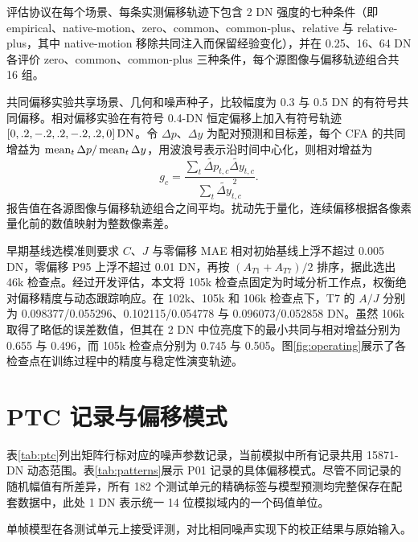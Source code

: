 
评估协议在每个场景、每条实测偏移轨迹下包含 2 DN 强度的七种条件（即 empirical、native-motion、zero、common、common-plus、relative 与 relative-plus，其中 native-motion 移除共同注入而保留经验变化），并在 0.25、16、64 DN 各评价 zero、common、common-plus 三种条件，每个源图像与偏移轨迹组合共 16 组。

共同偏移实验共享场景、几何和噪声种子，比较幅度为 0.3 与 0.5 DN 的有符号共同偏移。相对偏移实验在有符号 0.4-DN 恒定偏移上加入有符号轨迹 $[0,.2,-.2,.2,-.2,.2,0]\,\mathrm{DN}$。令 $\Delta p$、$\Delta y$ 为配对预测和目标差，每个 CFA 的共同增益为 $\operatorname{mean}_t\Delta p/\operatorname{mean}_t\Delta y$，用波浪号表示沿时间中心化，则相对增益为
\begin{equation}
 g_c=\frac{\sum_t\widetilde{\Delta p}_{t,c}\widetilde{\Delta y}_{t,c}}
 {\sum_t\widetilde{\Delta y}_{t,c}^{\,2}}.
\end{equation}
报告值在各源图像与偏移轨迹组合之间平均。扰动先于量化，连续偏移根据各像素量化前的数值映射为整数像素差。

早期基线选模准则要求 $C$、$J$ 与零偏移 MAE 相对初始基线上浮不超过 0.005 DN，零偏移 P95 上浮不超过 0.01 DN，再按 $(A_{T1}+A_{T7})/2$ 排序，据此选出 46k 检查点。经过开发评估，本文将 105k 检查点固定为时域分析工作点，权衡绝对偏移精度与动态跟踪响应。在 102k、105k 和 106k 检查点下，T7 的 $A/J$ 分别为 0.098377/0.055296、0.102115/0.054778 与 0.096073/0.052858 DN。虽然 106k 取得了略低的误差数值，但其在 2 DN 中位亮度下的最小共同与相对增益分别为 0.655 与 0.496，而 105k 检查点分别为 0.745 与 0.505。图\ref{fig:operating}展示了各检查点在训练过程中的精度与稳定性演变轨迹。

\section{PTC 记录与偏移模式}
\label{app:ptc}
\enlargethispage{10pt}


表\ref{tab:ptc}列出矩阵行标对应的噪声参数记录，当前模拟中所有记录共用 15871-DN 动态范围。表\ref{tab:patterns}展示 P01 记录的具体偏移模式。尽管不同记录的随机幅值有所差异，所有 182 个测试单元的精确标签与模型预测均完整保存在配套数据中，此处 1 DN 表示统一 14 位模拟域内的一个码值单位。

单帧模型在各测试单元上接受评测，对比相同噪声实现下的校正结果与原始输入。

